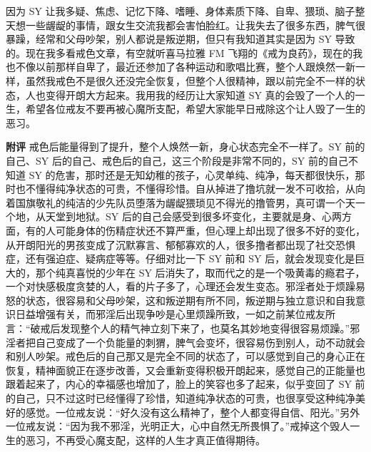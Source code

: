\begin{case}
    因为 SY 让我多疑、焦虑、记忆下降、嗜睡、身体素质下降、自卑、猥琐、脑子整天想一些龌龊的事情，跟女生交流我都会害怕脸红。让我失去了很多东西，脾气很暴躁，经常和父母吵架，别人都说是叛逆期，但只有我知道其实是因为 SY 导致的。现在我多看戒色文章，有空就听喜马拉雅 FM 飞翔的《戒为良药》，现在的我也不像以前那样自卑了，最近还参加了各种运动和歌唱比赛，整个人跟焕然一新一样，虽然我戒色不是很久还没完全恢复，但整个人很精神，跟以前完全不一样的状态，人也变得开朗大方起来。我用我的经历让大家知道 SY 真的会毁了一个人的一生，希望各位戒友不要再被心魔所支配，希望大家能早日戒除这个让人毁了一生的恶习。

    \textbf{附评} 戒色后能量得到了提升，整个人焕然一新，身心状态完全不一样了。SY 前的自己、SY 后的自己、戒色后的自己，这三个阶段是非常不同的，SY 前的自己不知道 SY 的危害，那时还是无知幼稚的孩子，心灵单纯、纯净，每天都很快乐，那时也不懂得纯净状态的可贵，不懂得珍惜。自从掉进了撸坑就一发不可收拾，从向着国旗敬礼的纯洁的少先队员堕落为龌龊猥琐见不得光的撸管男，真可谓一个天一个地，从天堂到地狱。SY 后的自己会感受到很多坏变化，主要就是身、心两方面，有的人可能身体的伤精症状还不算严重，但心理上却出现了很多不好的变化，从开朗阳光的男孩变成了沉默寡言、郁郁寡欢的人，很多撸者都出现了社交恐惧症，还有强迫症、疑病症等等。仔细对比一下 SY 前和 SY 后，就会发现变化是巨大的，那个纯真喜悦的少年在 SY 后消失了，取而代之的是一个吸黄毒的瘾君子，一个对快感极度贪婪的人，看的片子多了，心理还会发生变态。邪淫者处于烦躁易怒的状态，很容易和父母吵架，这和叛逆期有所不同，叛逆期与独立意识和自我意识日益增强有关，而邪淫后出现争吵是心里烦躁所致，一如之前某位戒友所言：“破戒后发现整个人的精气神立刻下来了，也莫名其妙地变得很容易烦躁。”邪淫者把自己变成了一个负能量的刺猬，脾气会变坏，很容易伤到别人，动不动就会和别人吵架。戒色后的自己那又是完全不同的状态了，可以感觉到自己的身心正在恢复，精神面貌正在逐步改善，又会重新变得积极开朗起来，感觉自己的正能量也跟着起来了，内心的幸福感也增加了，脸上的笑容也多了起来，似乎变回了 SY 前的自己，只不过这时已经懂得了珍惜，知道纯净状态的可贵，也很享受这种纯净美好的感觉。一位戒友说：“好久没有这么精神了，整个人都变得自信、阳光。”另外一位戒友说：“因为我不邪淫，光明正大，心中自然无所畏惧了。”戒掉这个毁人一生的恶习，不再受心魔支配，这样的人生才真正值得期待。
\end{case}

